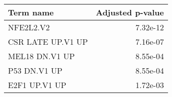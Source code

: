 \begin{tabular}{lr}
\toprule
        Term name &  Adjusted p-value \\
\midrule
        NFE2L2.V2 &          7.32e-12 \\
CSR LATE UP.V1 UP &          7.16e-07 \\
   MEL18 DN.V1 UP &          8.55e-04 \\
     P53 DN.V1 UP &          8.55e-04 \\
    E2F1 UP.V1 UP &          1.72e-03 \\
\bottomrule
\end{tabular}
